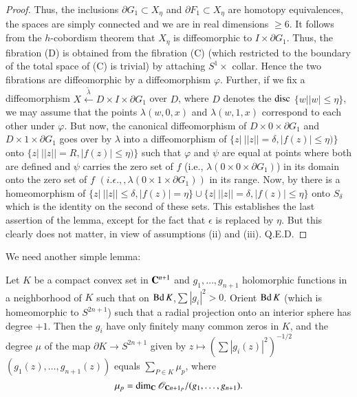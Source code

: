 \begin{proof}
Thus, the inclusions $\partial G_1 \subset X_\eta$ and $\partial F_1 \subset X_\eta$ are homotopy equivalences, the spaces are simply connected and we are in real dimensions $\geqslant 6$. It follows from the $h$-cobordism theorem \cite{art10-key8} that $X_\eta$ is diffeomorphic to $I\times \partial G_1$. Thus, the fibration (D) is obtained from the fibration (C) (which restricted to the boundary of the total space of (C) is trivial) by attaching $S^1 \times $ collar. Hence the two fibrations are diffeomorphic by a diffeomorphism $\varphi$. Further, if we fix a diffeomorphism $X \xleftarrow{\utilde{\lambda}} D \times I \times \partial G_1$ over $D$, where $D$ denotes the $\operatorname{disc}$ $\{w||w| \leqslant \eta\}$, we may assume that the points $\lambda (w, 0, x)$ and $\lambda (w, 1, x)$ correspond to each other under $\varphi$. But now, the canonical diffeomorphism of $D \times 0 \times \partial G_1$ and $D \times 1 \times \partial G_1$ goes over by $\lambda$ into a diffeomorphism of $\{z| ~ ||z|| = \delta, |f(z)| \leqslant \eta)\}$ onto $\{z|~ ||z|| = R, |f(z)| \leqslant \eta)\}$ such that $\varphi$ and $\psi$ are equal at points where both are defined and $\psi$ carries the zero set of $f$ (i.e., $\lambda (0 \times 0 \times \partial G_1)$) in its domain onto the zero set of $f$ $(i.\epsilon.,, \lambda (0 \times 1 \times \partial G_1))$ in its range. Now, by \cite{art10-key9} there is a homeomorphism of $\{z| ~ ||z|| \leqslant \delta, |f(z)| = \eta \} \cup \{z | ~ || z|| = \delta, |f(z)| \leqslant \eta\}$   onto $S_\delta$ which is the identity on the second of these sets. This establishes the last assertion of the lemma, except for the fact that $\epsilon$ is replaced by $\eta$. But this clearly does not matter, in view of assumptions (ii) and (iii). Q.E.D.
\end{proof}

We need another simple lemma:

\begin{lemma}\label{art10-lem2.3}
Let $K$ be a compact convex set in $\mathbf{C}^{n+1}$ and $g_1,\ldots, g_{n+1}$ holomorphic functions in a neighborhood of $K$ such that on $\operatorname{Bd} K$,\break $\sum |g_i|^2 > 0$. Orient $\operatorname{Bd} K$ (which is homeomorphic to $S^{2n+1}$) such that a radial projection onto an interior sphere has degree $+1$. Then the $g_i$ have only finitely many common zeros in $K$, and the degree $\mu$ of the map $\partial K \to S^{2n+1}$ given by $z \mapsto (\sum | g_i (z)|^2)^{-1/2}$ $(g_1(z), \ldots, g_{n+1} (z))$ equals $\sum_{P\in K} \mu_p$, where
$$
\mu_p = \dim_{\mathbf{C}} \mathscr{O}_{\mathbf{C} n +1_P} / (g_1, \ldots, g_{n+1}).
$$
\end{lemma}

